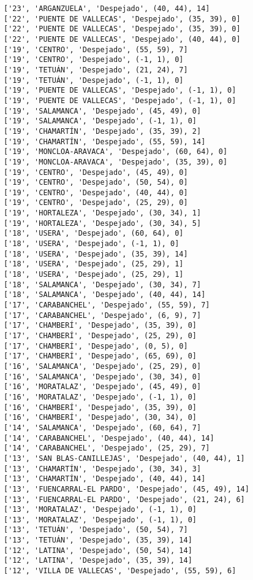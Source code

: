 \documentclass[11pt]{article}
\begin{document}
\begin{Verbatim}[commandchars=\\\{\}]
['23', 'ARGANZUELA', 'Despejado', (40, 44), 14]
['22', 'PUENTE DE VALLECAS', 'Despejado', (35, 39), 0]
['22', 'PUENTE DE VALLECAS', 'Despejado', (35, 39), 0]
['22', 'PUENTE DE VALLECAS', 'Despejado', (40, 44), 0]
['19', 'CENTRO', 'Despejado', (55, 59), 7]
['19', 'CENTRO', 'Despejado', (-1, 1), 0]
['19', 'TETUÁN', 'Despejado', (21, 24), 7]
['19', 'TETUÁN', 'Despejado', (-1, 1), 0]
['19', 'PUENTE DE VALLECAS', 'Despejado', (-1, 1), 0]
['19', 'PUENTE DE VALLECAS', 'Despejado', (-1, 1), 0]
['19', 'SALAMANCA', 'Despejado', (45, 49), 0]
['19', 'SALAMANCA', 'Despejado', (-1, 1), 0]
['19', 'CHAMARTÍN', 'Despejado', (35, 39), 2]
['19', 'CHAMARTÍN', 'Despejado', (55, 59), 14]
['19', 'MONCLOA-ARAVACA', 'Despejado', (60, 64), 0]
['19', 'MONCLOA-ARAVACA', 'Despejado', (35, 39), 0]
['19', 'CENTRO', 'Despejado', (45, 49), 0]
['19', 'CENTRO', 'Despejado', (50, 54), 0]
['19', 'CENTRO', 'Despejado', (40, 44), 0]
['19', 'CENTRO', 'Despejado', (25, 29), 0]
['19', 'HORTALEZA', 'Despejado', (30, 34), 1]
['19', 'HORTALEZA', 'Despejado', (30, 34), 5]
['18', 'USERA', 'Despejado', (60, 64), 0]
['18', 'USERA', 'Despejado', (-1, 1), 0]
['18', 'USERA', 'Despejado', (35, 39), 14]
['18', 'USERA', 'Despejado', (25, 29), 1]
['18', 'USERA', 'Despejado', (25, 29), 1]
['18', 'SALAMANCA', 'Despejado', (30, 34), 7]
['18', 'SALAMANCA', 'Despejado', (40, 44), 14]
['17', 'CARABANCHEL', 'Despejado', (55, 59), 7]
['17', 'CARABANCHEL', 'Despejado', (6, 9), 7]
['17', 'CHAMBERÍ', 'Despejado', (35, 39), 0]
['17', 'CHAMBERÍ', 'Despejado', (25, 29), 0]
['17', 'CHAMBERÍ', 'Despejado', (0, 5), 0]
['17', 'CHAMBERÍ', 'Despejado', (65, 69), 0]
['16', 'SALAMANCA', 'Despejado', (25, 29), 0]
['16', 'SALAMANCA', 'Despejado', (30, 34), 0]
['16', 'MORATALAZ', 'Despejado', (45, 49), 0]
['16', 'MORATALAZ', 'Despejado', (-1, 1), 0]
['16', 'CHAMBERÍ', 'Despejado', (35, 39), 0]
['16', 'CHAMBERÍ', 'Despejado', (30, 34), 0]
['14', 'SALAMANCA', 'Despejado', (60, 64), 7]
['14', 'CARABANCHEL', 'Despejado', (40, 44), 14]
['14', 'CARABANCHEL', 'Despejado', (25, 29), 7]
['13', 'SAN BLAS-CANILLEJAS', 'Despejado', (40, 44), 1]
['13', 'CHAMARTÍN', 'Despejado', (30, 34), 3]
['13', 'CHAMARTÍN', 'Despejado', (40, 44), 14]
['13', 'FUENCARRAL-EL PARDO', 'Despejado', (45, 49), 14]
['13', 'FUENCARRAL-EL PARDO', 'Despejado', (21, 24), 6]
['13', 'MORATALAZ', 'Despejado', (-1, 1), 0]
['13', 'MORATALAZ', 'Despejado', (-1, 1), 0]
['13', 'TETUÁN', 'Despejado', (50, 54), 7]
['13', 'TETUÁN', 'Despejado', (35, 39), 14]
['12', 'LATINA', 'Despejado', (50, 54), 14]
['12', 'LATINA', 'Despejado', (35, 39), 14]
['12', 'VILLA DE VALLECAS', 'Despejado', (55, 59), 6]

\end{Verbatim}
\end{document}

